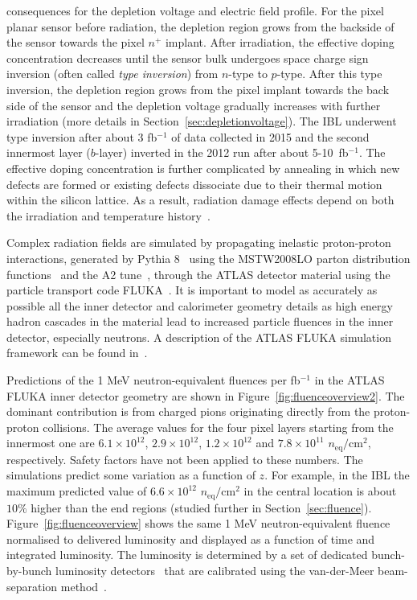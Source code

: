 consequences for the depletion voltage and electric field profile. For the pixel planar sensor before 
radiation, the depletion region grows from the backside of the sensor towards the pixel $n^+$ implant. 
After irradiation, the effective doping concentration decreases until the sensor bulk undergoes space 
charge sign inversion (often called \textit{type inversion}) from $n$-type to $p$-type. After this type 
inversion, the depletion region grows from the pixel implant towards the back side of the sensor and the 
depletion voltage gradually increases with further irradiation (more details in 
Section~\ref{sec:depletionvoltage}). The IBL underwent type inversion after about 3 fb$^{-1}$ of data 
collected in 2015 and the second innermost layer ($b$-layer) inverted in the 2012 run after about 
5-10~fb$^{-1}$. The effective doping concentration is further complicated by annealing in which new 
defects are formed or existing defects dissociate due to their thermal motion within the silicon lattice. As 
a result, radiation damage effects depend on both the irradiation and temperature 
history~\cite{moll-thesis}. 

 Complex radiation fields are simulated by 
propagating inelastic proton-proton interactions, generated by 
Pythia 8~\cite{Sjostrand:2006za,Sjostrand:2014zea} using the MSTW2008LO parton distribution 
functions~\cite{Martin:2009iq} and the A2 tune~\cite{ATLAS:2012uec}, through the ATLAS detector 
material using the particle transport code FLUKA~\cite{Battistoni:2007zzb,Ferrari:898301}. It is 
important to model as accurately as possible all the inner detector and calorimeter geometry details as 
high energy hadron cascades in the material lead to increased particle fluences in the inner detector, 
especially neutrons. A description of the ATLAS FLUKA simulation framework can be found 
in~\cite{Baranov:814823}.

Predictions of the 1 MeV neutron-equivalent fluences per fb$^{-1}$ in the ATLAS FLUKA inner detector 
geometry are shown in Figure~\ref{fig:fluenceoverview2}. The dominant contribution is from charged 
pions originating directly from the proton-proton collisions. The average values for the four pixel layers 
starting from the innermost one are $6.1\times 10^{12}$, $2.9\times 10^{12}$, $1.2\times 10^{12}$ 
and $7.8\times 10^{11}$ $n_\text{eq}/\text{cm}^2$, respectively. Safety factors have not been applied to 
these numbers.  The simulations predict some variation as a function of $z$.  For example, in the IBL 
the maximum predicted value of $6.6\times 10^{12}$ $n_\text{eq}/\text{cm}^2$ in the central location is 
about $10\%$ higher than the end regions (studied further in Section~\ref{sec:fluence}). 
Figure~\ref{fig:fluenceoverview} shows the same 1 MeV neutron-equivalent fluence normalised to 
delivered luminosity and displayed as a function of time and integrated luminosity. The luminosity is 
determined by a set of dedicated bunch-by-bunch luminosity detectors~\cite{Aaboud:2016hhf} that are 
calibrated using the van-der-Meer beam-separation method~\cite{vanderMeer:296752}.

